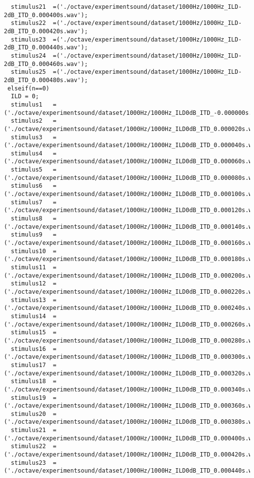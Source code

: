 {\begin{verbatim}
  stimulus21  =('./octave/experimentsound/dataset/1000Hz/1000Hz_ILD-2dB_ITD_0.000400s.wav');
  stimulus22  =('./octave/experimentsound/dataset/1000Hz/1000Hz_ILD-2dB_ITD_0.000420s.wav');
  stimulus23  =('./octave/experimentsound/dataset/1000Hz/1000Hz_ILD-2dB_ITD_0.000440s.wav');
  stimulus24  =('./octave/experimentsound/dataset/1000Hz/1000Hz_ILD-2dB_ITD_0.000460s.wav');
  stimulus25  =('./octave/experimentsound/dataset/1000Hz/1000Hz_ILD-2dB_ITD_0.000480s.wav');
 elseif(n==0)
  ILD = 0;
  stimulus1   =('./octave/experimentsound/dataset/1000Hz/1000Hz_ILD0dB_ITD_-0.000000s.wav');
  stimulus2   =('./octave/experimentsound/dataset/1000Hz/1000Hz_ILD0dB_ITD_0.000020s.wav');
  stimulus3   =('./octave/experimentsound/dataset/1000Hz/1000Hz_ILD0dB_ITD_0.000040s.wav');
  stimulus4   =('./octave/experimentsound/dataset/1000Hz/1000Hz_ILD0dB_ITD_0.000060s.wav');
  stimulus5   =('./octave/experimentsound/dataset/1000Hz/1000Hz_ILD0dB_ITD_0.000080s.wav');
  stimulus6   =('./octave/experimentsound/dataset/1000Hz/1000Hz_ILD0dB_ITD_0.000100s.wav');
  stimulus7   =('./octave/experimentsound/dataset/1000Hz/1000Hz_ILD0dB_ITD_0.000120s.wav');
  stimulus8   =('./octave/experimentsound/dataset/1000Hz/1000Hz_ILD0dB_ITD_0.000140s.wav');
  stimulus9   =('./octave/experimentsound/dataset/1000Hz/1000Hz_ILD0dB_ITD_0.000160s.wav');
  stimulus10  =('./octave/experimentsound/dataset/1000Hz/1000Hz_ILD0dB_ITD_0.000180s.wav');
  stimulus11  =('./octave/experimentsound/dataset/1000Hz/1000Hz_ILD0dB_ITD_0.000200s.wav');
  stimulus12  =('./octave/experimentsound/dataset/1000Hz/1000Hz_ILD0dB_ITD_0.000220s.wav');
  stimulus13  =('./octave/experimentsound/dataset/1000Hz/1000Hz_ILD0dB_ITD_0.000240s.wav');
  stimulus14  =('./octave/experimentsound/dataset/1000Hz/1000Hz_ILD0dB_ITD_0.000260s.wav');
  stimulus15  =('./octave/experimentsound/dataset/1000Hz/1000Hz_ILD0dB_ITD_0.000280s.wav');
  stimulus16  =('./octave/experimentsound/dataset/1000Hz/1000Hz_ILD0dB_ITD_0.000300s.wav');
  stimulus17  =('./octave/experimentsound/dataset/1000Hz/1000Hz_ILD0dB_ITD_0.000320s.wav');
  stimulus18  =('./octave/experimentsound/dataset/1000Hz/1000Hz_ILD0dB_ITD_0.000340s.wav');
  stimulus19  =('./octave/experimentsound/dataset/1000Hz/1000Hz_ILD0dB_ITD_0.000360s.wav');
  stimulus20  =('./octave/experimentsound/dataset/1000Hz/1000Hz_ILD0dB_ITD_0.000380s.wav');
  stimulus21  =('./octave/experimentsound/dataset/1000Hz/1000Hz_ILD0dB_ITD_0.000400s.wav');
  stimulus22  =('./octave/experimentsound/dataset/1000Hz/1000Hz_ILD0dB_ITD_0.000420s.wav');
  stimulus23  =('./octave/experimentsound/dataset/1000Hz/1000Hz_ILD0dB_ITD_0.000440s.wav');

\end{verbatim}}

